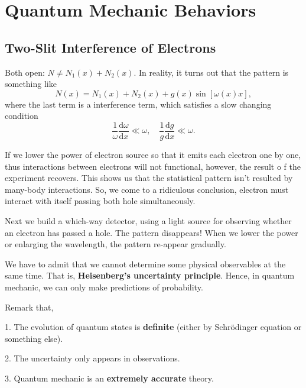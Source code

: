 
\chapter{Quantum Mechanic Behaviors}

\section{Two-Slit Interference of Electrons}
Both open: $N \neq N_1(x) + N_2(x)$. In reality, it turns out that the pattern is something like 
\begin{equation}
  N(x) = N_1(x) + N_2(x) + g(x)\sin \left[ \omega(x) x\right],
\end{equation}
where the last term is a interference term,
which satisfies a slow changing condition
\begin{equation}
  \frac{1}{\omega} \frac{\mathrm{d}\omega}{\mathrm{d} x} \ll \omega, \quad \frac{1}{g}\frac{\mathrm{d}g}{\mathrm{d} x} \ll \omega.
\end{equation}

If we lower the power of electron source so that it emits each electron one by one, thus interactions between electrons will not functional, however, the result o  f the experiment recovers. This shows us that the statistical pattern isn't resulted by many-body interactions. So, we come to a ridiculous conclusion, electron must interact with itself passing both hole simultaneously.

Next we build a which-way detector, using a light source for observing whether an electron has passed a hole. The pattern disappears! When we lower the power or enlarging the wavelength, the pattern re-appear gradually.

We have to admit that we cannot determine some physical observables at the same time.
That is, \textbf{Heisenberg's uncertainty principle}. Hence, in quantum mechanic, we can only make predictions of probability.

Remark that,

1. The evolution of quantum states is \textbf{definite} (either by Schr\"odinger equation or something else).

2. The uncertainty only appears in observations.

3. Quantum mechanic is an \textbf{extremely accurate} theory.